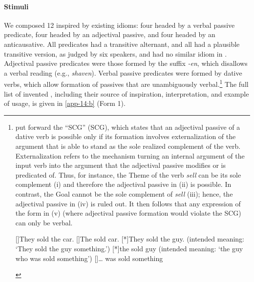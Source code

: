 \documentclass[output=paper]{langsci/langscibook}
\begin{document}
\largerpage
\paragraph*{Stimuli} We composed 12   inspired by existing
 idioms: four headed by a verbal passive predicate,
four headed by an
adjectival passive, and four headed by an anticausative. All predicates had a
transitive alternant, and all  had a plausible transitive version,
as judged by six speakers, and had no similar idiom in . Adjectival
passive predicates were those formed by the suffix \emph{-en}, which disallows
a verbal reading (e.g., \emph{shaven}). Verbal passive predicates were formed
by dative verbs, which allow formation of passives that are unambiguously
verbal.\footnote{\textcite{LevRap1986} put forward the \enquote{\glsdesc{SCG}}
    (\gls{SCG}), which states that an adjectival passive of a
    dative verb is possible only if its formation involves externalization of
    the argument that is able to stand as the sole realized complement of the
    verb.  Externalization refers to the mechanism turning an internal argument
    of the input verb into the argument that the adjectival passive modifies or
    is predicated of.  Thus, for instance, the Theme of the verb \emph{sell}
    can be its sole complement (i) and therefore the adjectival passive in (ii)
    is possible. In contrast, the Goal cannot be the sole complement of
    \emph{sell} (iii); hence, the adjectival passive in (iv) is ruled out. It
    then follows that any expression of the form in (v) (where adjectival
    passive formation would violate the \gls{SCG}) can only be verbal.

    \begin{exe}

        []{They sold the car.}
        []{The sold car.}
        [*]{They sold the guy. (intended meaning: \enquote*{They
        sold the guy something.})}
        [*]{the sold guy (intended meaning: \enquote*{the guy who was
        sold something})}
        []{\dots{} was sold something}

    \end{exe}} The full list of invented , including their 
    source of inspiration, interpretation, and example of usage, is given in
    \ref{app-14:b} (Form 1).
\end{document}
